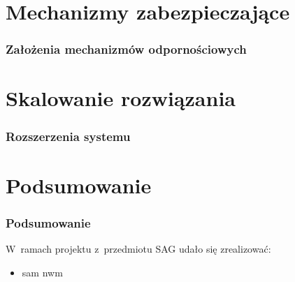 \documentclass{beamer}
\begin{document}
\section{Mechanizmy zabezpieczające}
\begin{frame}
    \frametitle{Założenia mechanizmów odpornościowych}

\end{frame}

\section{Skalowanie rozwiązania}
\begin{frame}
    \frametitle{Rozszerzenia systemu}

\end{frame}

\section{Podsumowanie}
\begin{frame}
    \frametitle{Podsumowanie}
    W~ramach projektu z~przedmiotu SAG udało się zrealizować:
    \begin{itemize}
        \item sam nwm
    \end{itemize}
\end{frame}
\end{document}
